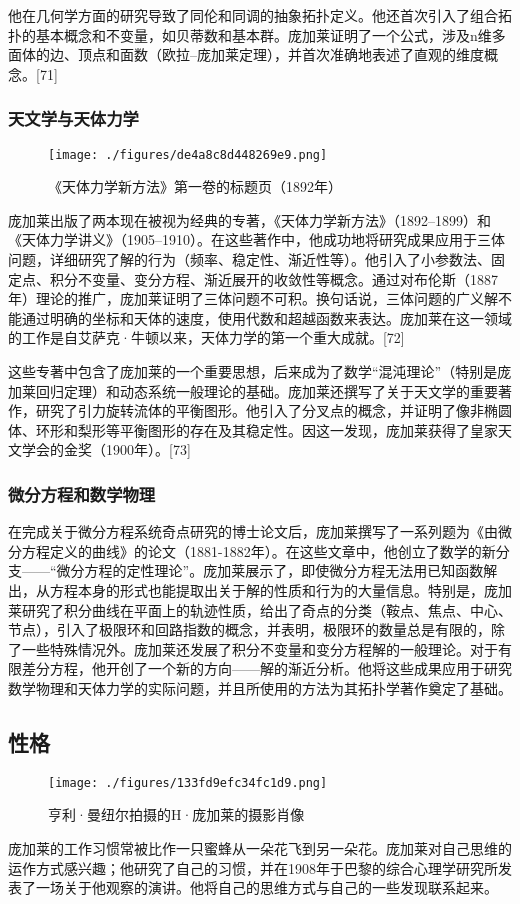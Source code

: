 他在几何学方面的研究导致了同伦和同调的抽象拓扑定义。他还首次引入了组合拓扑的基本概念和不变量，如贝蒂数和基本群。庞加莱证明了一个公式，涉及n维多面体的边、顶点和面数（欧拉–庞加莱定理），并首次准确地表述了直观的维度概念。[71]
\subsubsection{天文学与天体力学}
\begin{figure}[ht]
\centering
\texttt{[image: ./figures/de4a8c8d448269e9.png]}
\caption{《天体力学新方法》第一卷的标题页（1892年）} \label{fig_HLPJL_4}
\end{figure}
庞加莱出版了两本现在被视为经典的专著，《天体力学新方法》（1892–1899）和《天体力学讲义》（1905–1910）。在这些著作中，他成功地将研究成果应用于三体问题，详细研究了解的行为（频率、稳定性、渐近性等）。他引入了小参数法、固定点、积分不变量、变分方程、渐近展开的收敛性等概念。通过对布伦斯（1887年）理论的推广，庞加莱证明了三体问题不可积。换句话说，三体问题的广义解不能通过明确的坐标和天体的速度，使用代数和超越函数来表达。庞加莱在这一领域的工作是自艾萨克·牛顿以来，天体力学的第一个重大成就。[72]

这些专著中包含了庞加莱的一个重要思想，后来成为了数学“混沌理论”（特别是庞加莱回归定理）和动态系统一般理论的基础。庞加莱还撰写了关于天文学的重要著作，研究了引力旋转流体的平衡图形。他引入了分叉点的概念，并证明了像非椭圆体、环形和梨形等平衡图形的存在及其稳定性。因这一发现，庞加莱获得了皇家天文学会的金奖（1900年）。[73]
\subsubsection{微分方程和数学物理}
在完成关于微分方程系统奇点研究的博士论文后，庞加莱撰写了一系列题为《由微分方程定义的曲线》的论文（1881-1882年）。在这些文章中，他创立了数学的新分支——“微分方程的定性理论”。庞加莱展示了，即使微分方程无法用已知函数解出，从方程本身的形式也能提取出关于解的性质和行为的大量信息。特别是，庞加莱研究了积分曲线在平面上的轨迹性质，给出了奇点的分类（鞍点、焦点、中心、节点），引入了极限环和回路指数的概念，并表明，极限环的数量总是有限的，除了一些特殊情况外。庞加莱还发展了积分不变量和变分方程解的一般理论。对于有限差分方程，他开创了一个新的方向——解的渐近分析。他将这些成果应用于研究数学物理和天体力学的实际问题，并且所使用的方法为其拓扑学著作奠定了基础。
\subsection{性格}
\begin{figure}[ht]
\centering
\texttt{[image: ./figures/133fd9efc34fc1d9.png]}
\caption{亨利·曼纽尔拍摄的H·庞加莱的摄影肖像} \label{fig_HLPJL_5}
\end{figure}
庞加莱的工作习惯常被比作一只蜜蜂从一朵花飞到另一朵花。庞加莱对自己思维的运作方式感兴趣；他研究了自己的习惯，并在1908年于巴黎的综合心理学研究所发表了一场关于他观察的演讲。他将自己的思维方式与自己的一些发现联系起来。

